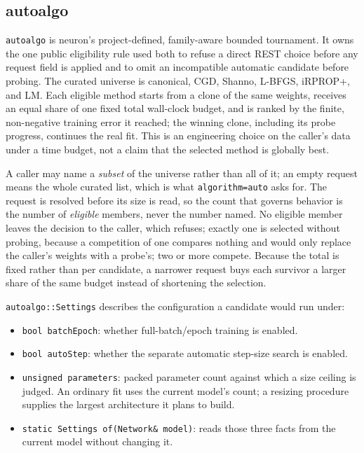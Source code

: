 \subsection{autoalgo}
\texttt{autoalgo} is neuron's project-defined, family-aware bounded tournament.
It owns the one public eligibility rule used both to refuse a direct REST choice
before any request field is applied and to omit an incompatible automatic
candidate before probing.  The curated universe is canonical, CGD, Shanno,
L-BFGS, iRPROP+, and LM. Each eligible method starts from a clone of the same
weights, receives an equal share of one fixed total wall-clock budget, and is
ranked by the finite, non-negative training error it reached; the winning clone, including its
probe progress, continues the real fit. This is an engineering choice on the
caller's data under a time budget, not a claim that the selected method is
globally best.

A caller may name a \emph{subset} of the universe rather than all of it; an
empty request means the whole curated list, which is what
\texttt{algorithm=auto} asks for. The request is resolved before its size is
read, so the count that governs behavior is the number of \emph{eligible}
members, never the number named. No eligible member leaves the decision to the
caller, which refuses; exactly one is selected without probing, because a
competition of one compares nothing and would only replace the caller's weights
with a probe's; two or more compete. Because the total is fixed rather than
per candidate, a narrower request buys each survivor a larger share of the same
budget instead of shortening the selection.

\texttt{autoalgo::Settings} describes the configuration a candidate would run
under:

\begin{itemize}
\item \texttt{bool batchEpoch}: whether full-batch/epoch training is enabled.
\item \texttt{bool autoStep}: whether the separate automatic step-size search
      is enabled.
\item \texttt{unsigned parameters}: packed parameter count against which a
      size ceiling is judged. An ordinary fit uses the current model's count;
      a resizing procedure supplies the largest architecture it plans to build.
\item \texttt{static Settings of(Network\& model)}: reads those three facts
      from the current model without changing it.
\end{itemize}

